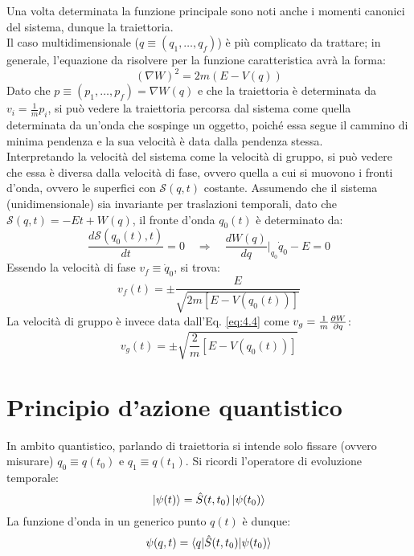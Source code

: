 Una volta determinata la funzione principale sono noti anche i momenti canonici del sistema, dunque la traiettoria.\\
Il caso multidimensionale ($ q \equiv (q_1, \dots, q_f) $) è più complicato da trattare; in generale, l'equazione da risolvere per la funzione caratteristica avrà la forma:
\begin{equation}
	(\nabla W)^2 = 2m \left( E - V(q) \right)
	\label{eq:4.8}
\end{equation}
Dato che $ p \equiv (p_1, \dots, p_f) = \nabla W(q) $ e che la traiettoria è determinata da $ v_i = \frac{1}{m} p_i $, si può vedere la traiettoria percorsa dal sistema come quella determinata da un'onda che sospinge un oggetto, poiché essa segue il cammino di minima pendenza e la sua velocità è data dalla pendenza stessa.\\
Interpretando la velocità del sistema come la velocità di gruppo, si può vedere che essa è diversa dalla velocità di fase, ovvero quella a cui si muovono i fronti d'onda, ovvero le superfici con $ \mathcal{S}(q,t) $ costante. Assumendo che il sistema (unidimensionale) sia invariante per traslazioni temporali, dato che $ \mathcal{S}(q,t) = -E t + W(q) $, il fronte d'onda $ q_0(t) $ è determinato da:
\begin{equation*}
	\frac{d \mathcal{S}(q_0(t),t)}{dt} = 0
	\quad \Rightarrow \quad
	\frac{dW(q)}{dq} \bigg\vert_{q_0} \dot{q}_0 - E = 0
\end{equation*}
Essendo la velocità di fase $ v_f \equiv \dot{q}_0 $, si trova:
\begin{equation}
	v_f(t) = \pm \frac{E}{\sqrt{2m \left[ E - V(q_0(t)) \right]}}
	\label{eq:4.9}
\end{equation}
La velocità di gruppo è invece data dall'Eq. \ref{eq:4.4} come $ v_g = \frac{1}{m} \frac{\partial W}{\partial q} $:
\begin{equation}
	v_g(t) = \pm \sqrt{\frac{2}{m} \left[ E - V(q_0(t)) \right]}
	\label{eq:4.10}
\end{equation}

\section{Principio d'azione quantistico}

In ambito quantistico, parlando di traiettoria si intende solo fissare (ovvero misurare) $ q_0 \equiv q(t_0) $ e $ q_1 \equiv q(t_1) $. Si ricordi l'operatore di evoluzione temporale:
\begin{equation}
	\ket{\psi(t)} = \hat{S}(t,t_0) \ket{\psi(t_0)}
	\label{eq:4.11}
\end{equation}
La funzione d'onda in un generico punto $ q(t) $ è dunque:
\begin{equation}
	\psi(q,t) = \braket{q | \hat{S}(t,t_0) | \psi(t_0)}
	\label{eq:4.12}
\end{equation}

